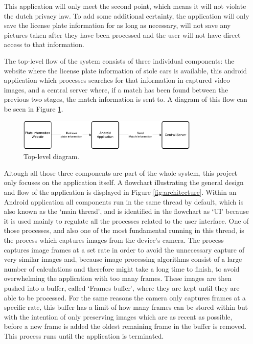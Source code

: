 This application will only meet the second point, which means it will not violate the dutch privacy law. To add some additional certainty, the application will only save the license plate information for as long as necessary, will not save any pictures taken after they have been processed and the user will not have direct access to that information.

The top-level flow of the system consists of three individual components: the website where the license plate information of stole cars is available, this android application which processes searches for that information in captured video images, and a central server where, if a match has been found between the previous two stages, the match information is sent to. A diagram of this flow can be seen in Figure \ref{fig:top-level}.

\begin{figure}[ht]
    \centering
    \includegraphics[width=0.8\textwidth]{plaatjes/top-down}
    \caption{Top-level diagram.}
    \label{fig:top-level}
\end{figure}%

Altough all those three components are part of the whole system, this project only focuses on the application itself. A flowchart illustrating the general design and flow of the application is displayed in Figure \ref{fig:architecture}. Within an Android application all components run in the same thread by default, which is also known as the `main thread', and is identified in the flowchart as `UI' because it is used mainly to regulate all the processes related to the user interface. One of those processes, and also one of the most fundamental running in this thread, is the process which captures images from the device's camera. The process captures image frames at a set rate in order to avoid the unnecessary capture of very similar images and, because image processing algorithms consist of a large number of calculations and therefore might take a long time to finish, to avoid overwhelming the application with too many frames. These images are then pushed into a buffer, called `Frames buffer', where they are kept until they are able to be processed. For the same reasons the camera only captures frames at a specific rate, this buffer has a limit of how many frames can be stored within but with the intention of only preserving images which are as recent as possible, before a new frame is added the oldest remaining frame in the buffer is removed. This process runs until the application is terminated.

